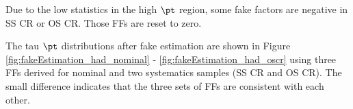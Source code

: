 

Due to the low statistics in the high $\pt$ region, some fake factors are negative in SS CR or OS CR. Those FFs are reset to zero.

The tau $\pt$ distributions after fake estimation are shown in Figure \ref{fig:fakeEstimation_had_nominal} - \ref{fig:fakeEstimation_had_oscr} using three FFs derived for nominal and two systematics samples (SS CR and OS CR). The small difference indicates that the three sets of FFs are consistent with each other.


\clearpage
